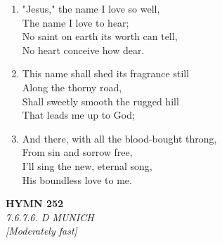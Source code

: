 \begin{enumerate}
    \item "Jesus," the name I love so well, \\
            The name I love to hear; \\
        No saint on earth its worth can tell, \\
            No heart conceive how dear.

    \item This name shall shed its fragrance still \\
            Along the thorny road, \\
        Shall sweetly smooth the rugged hill \\
            That leads me up to God;

    \item And there, with all the blood-bought throng, \\
            From sin and sorrow free, \\
        I'll sing the new, eternal song, \\
            His boundless love to me.

\end{enumerate}

\newpage
\begin{center}
    {\Large \textbf{HYMN 252}}
    \\
    \textit{7.6.7.6. D MUNICH}
    \\
    \textit{\small [Moderately fast]}
\end{center}
\vspace{1em}

